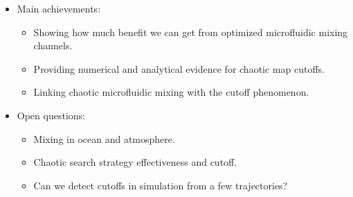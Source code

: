 \documentclass[12pt,t]{beamer}
\begin{document}
\begin{frame}
 \begin{itemize}
  
  \item Main achievements: 
    \begin{itemize}
    \item Showing how much benefit we can get from optimized microfluidic mixing channels.
    \item Providing numerical and analytical evidence for chaotic map cutoffs.
    \item Linking chaotic microfluidic mixing with the cutoff phenomenon.     
    \end{itemize}
  \item Open questions:
    \begin{itemize}
    \item Mixing in ocean and atmosphere.
    \item Chaotic search strategy effectiveness and cutoff.
    \item Can we detect cutoffs in simulation from a few trajectories?
    \end{itemize}
 \end{itemize}
\end{frame}
\end{document}
